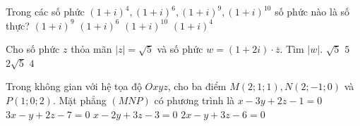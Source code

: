 \begin{ex}%
	Trong các số phức $\left(1+i \right)^4,\left(1+i \right)^6,\left(1+i \right)^9,\left(1+i \right)^{10}$ số phức nào là số thực?
	\choice
	{$\left(1+i \right)^9$}
	{$\left(1+i \right)^6$}
	{$\left(1+i \right)^{10}$}
	{\True $\left(1+i \right)^4$}
\end{ex}

\begin{ex}%
	Cho số phức $z$ thỏa mãn $|z|=\sqrt{5}$ và số phức $w=\left(1+2i \right)\cdot \overline{z}$. Tìm $|w|$.
	\choice
	{$\sqrt{5}$}
	{\True $5$}
	{$2\sqrt{5}$}
	{$4$}
\end{ex} 

\begin{ex}%
	Trong không gian với hệ tọa độ $Oxyz$, cho ba điểm $M(2;1;1),N(2;-1;0)$ và $P(1;0;2)$. Mặt phẳng $(MNP)$ có phương trình là
	\choice
	{$x-3y+2z-1=0$}
	{\True $3x-y+2z-7=0$}
	{$x-2y+3z-3=0$}
	{$2x-y+3z-6=0$}
\end{ex}

